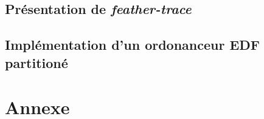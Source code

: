\documentclass{article}
\begin{document}
    \subsection{Présentation de \textit{feather-trace}}
    
    \subsection{Implémentation d'un ordonanceur EDF partitioné}
    
    
    
    
    
    \newpage
    \section*{Annexe}
    

    \newpage
    \newpage
    \listoffigures
    
    \printnoidxglossaries
\end{document}
